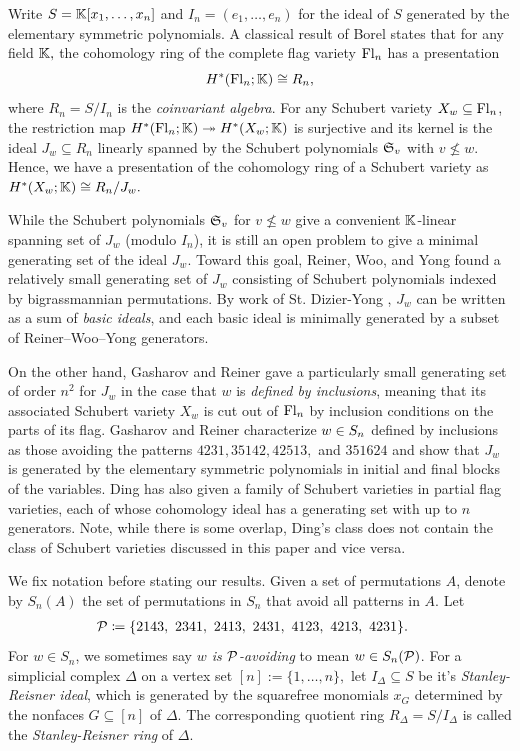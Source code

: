 Write $S = \mathbb{K}[x_1,\ldots,x_n]$ and $I_n = (e_1,\ldots,e_n)$ for the ideal of $S$ generated by the elementary symmetric polynomials. 
A classical result of Borel \cite{Borel1953} states that for any field $\mathbb{K},$ the cohomology ring of the complete flag variety $\mathrm{Fl}_n$ has a presentation
\[
H^*(\mathrm{Fl}_n;\mathbb{K})\cong R_n,
\]
where $R_n = S/I_n$ is the \emph{coinvariant algebra}. 
For any Schubert variety $X_w\subseteq \mathrm{Fl}_n$, the restriction map $H^*(\mathrm{Fl}_n;\mathbb{K})\twoheadrightarrow H^*(X_w;\mathbb{K})$ is surjective and its kernel is the ideal $J_w\subseteq R_n$ linearly spanned by the Schubert polynomials $\mathfrak{S}_v$ with $v\not\leq w.$ 
Hence, we have a presentation of the cohomology ring of a Schubert variety as $H^*(X_w;\mathbb{K})\cong R_n/J_w.$

While the Schubert polynomials $\mathfrak{S}_v$ for $v\not\leq w$ give a convenient $\mathbb{K}$-linear spanning set of $J_w$ (modulo $I_n$), it is still an open problem to give a minimal generating set of the ideal $J_w$. Toward this goal, Reiner, Woo, and Yong \cite{ReinerWooYong} found a relatively small generating set of $J_w$ consisting of Schubert polynomials indexed by bigrassmannian permutations.
By work of St. Dizier-Yong \cite{stdizier-yong}, $J_w$ can be written as a sum of \emph{basic ideals}, and each basic ideal is minimally generated by a subset of Reiner--Woo--Yong generators.

On the other hand, Gasharov and Reiner gave a particularly small generating set of order $n^2$ for $J_w$ in the case that $w$ is \emph{defined by inclusions}, meaning that its associated Schubert variety $X_w$ is cut out of $\mathrm{Fl}_n$ by inclusion conditions on the parts of its flag. 
Gasharov and Reiner characterize $w\in S_n$ defined by inclusions as those avoiding the patterns $4231,35142,42513,$ and $351624$ and show that $J_w$ is generated by the elementary symmetric polynomials in initial and final blocks of the variables. 
Ding \cite{ding01} has also given a family of Schubert varieties in partial flag varieties, each of whose cohomology ideal has a generating set with up to $n$ generators. 
Note, while there is some overlap, Ding's class does not contain the class of Schubert varieties discussed in this paper and vice versa. 

We fix notation before stating our results. 
Given a set of permutations $A$, denote by $S_n(A)$ the set of permutations in $S_n$ that avoid all patterns in $A$. 
Let
\begin{align*}
\mathcal{P} &\coloneqq \{ 2143,\ 2341,\ 2413,\ 2431,\ 4123,\ 4213,\ 4231 \}.
\end{align*}
For $w\in S_n$, we sometimes say \emph{$w$ is $\mathcal{P}$-avoiding} to mean $w\in S_n(\mathcal{P})$. 
For a simplicial complex $\Delta$ on a vertex set $[n]:=\{1,\ldots,n\},$ let $I_\Delta\subseteq S$ be it's \emph{Stanley-Reisner ideal}, which is generated by the squarefree monomials $x_G$ determined by the nonfaces $G\subseteq [n]$ of $\Delta.$ The corresponding quotient ring $R_{\Delta} = S/I_\Delta$ is called the \emph{Stanley-Reisner ring} of $\Delta$. 


